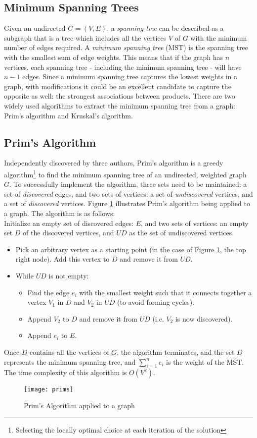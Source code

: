 \subsection{Minimum Spanning Trees}
Given an undirected $G = (V,E)$,  a \textit{spanning tree} can be described as a subgraph that is a tree which includes all the vertices $V$ of $G$ with the minimum number of edges required. A \textit{minimum spanning tree} (MST) is the spanning tree with the smallest sum of edge weights.  This means that if the graph has $n$ vertices, each spanning tree - including the minimum spanning tree - will have $n-1$ edges. Since a minimum spanning tree captures the lowest weights in a graph, with modifications it could be an excellent candidate to capture the opposite as well: the strongest associations between products.
There are two widely used algorithms to extract the minimum spanning tree from a graph: Prim's algorithm and Kruskal's algorithm.

\subsection{Prim's Algorithm}
Independently discovered by three authors,  Prim's algorithm  is a greedy algorithm\footnote{Selecting the locally optimal choice at each iteration of the solution} to find the minimum spanning tree of an undirected,  weighted graph $G$. To successfully implement the algorithm, three sets need to be maintained: a set of \textit{discovered} edges, and two sets of vertices: a set of \textit{undiscovered} vertices, and a set of \textit{discovered} vertices.  Figure \ref{fig:prim} illustrates Prim's algorithm being applied to a graph. The algorithm is as follows:\\
Initialize an empty set of discovered edges: $E$, and two sets of vertices: an empty set $D$ of the discovered vertices, and $UD$ as the set of undiscovered vertices.
\begin{itemize}
\item Pick an arbitrary vertex as a starting point (in the case of Figure \ref{fig:prim}, the top right node). Add this vertex to $D$ and remove it from $UD$.
\item While $UD$ is not empty:
	\begin{itemize}
	\item Find the edge $e_i$ with the smallest weight such that it connects together a vertex $V_1$ in $D$ and $V_2$ in $UD$ (to avoid forming cycles).
	\item Append $V_2$ to $D$ and remove it from $UD$ (i.e. $V_2$ is now discovered).
	\item Append $e_i$ to $E$.
	\end{itemize}
\end{itemize}
Once $D$ contains all the vertices of $G$, the algorithm terminates, and the set $D$ represents the minimum spanning tree, and $\sum\limits_{i=1}^n e_i$ is the weight of the MST. The time complexity of this algorithm is $O(V^2)$.
\begin{figure}[H]
\centering\texttt{[image: prims]}
\caption{Prim's Algorithm applied to a graph  }\label{fig:prim}
\end{figure}

